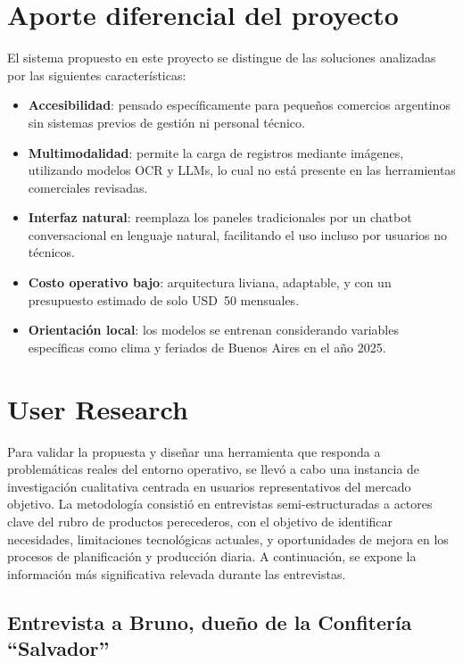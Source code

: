 \section{Aporte diferencial del proyecto}

El sistema propuesto en este proyecto se distingue de las soluciones analizadas por las siguientes características:

\begin{itemize}
    \item \textbf{Accesibilidad}: pensado específicamente para pequeños comercios argentinos sin sistemas previos de gestión ni personal técnico.

    \item \textbf{Multimodalidad}: permite la carga de registros mediante imágenes, utilizando modelos OCR y LLMs, lo cual no está presente en las herramientas comerciales revisadas.

    \item \textbf{Interfaz natural}: reemplaza los paneles tradicionales por un chatbot conversacional en lenguaje natural, facilitando el uso incluso por usuarios no técnicos.

    \item \textbf{Costo operativo bajo}: arquitectura liviana, adaptable, y con un presupuesto estimado de solo USD~50 mensuales.

    \item \textbf{Orientación local}: los modelos se entrenan considerando variables específicas como clima y feriados de Buenos Aires en el año 2025.
\end{itemize}


\section{User Research}

Para validar la propuesta y diseñar una herramienta que responda a problemáticas reales del entorno operativo, se llevó a cabo una instancia de investigación cualitativa centrada en usuarios representativos del mercado objetivo. La metodología consistió en entrevistas semi-estructuradas a actores clave del rubro de productos perecederos, con el objetivo de identificar necesidades, limitaciones tecnológicas actuales, y oportunidades de mejora en los procesos de planificación y producción diaria. A continuación, se expone la información más significativa relevada durante las entrevistas.

\subsection{Entrevista a Bruno, dueño de la Confitería ``Salvador''}

